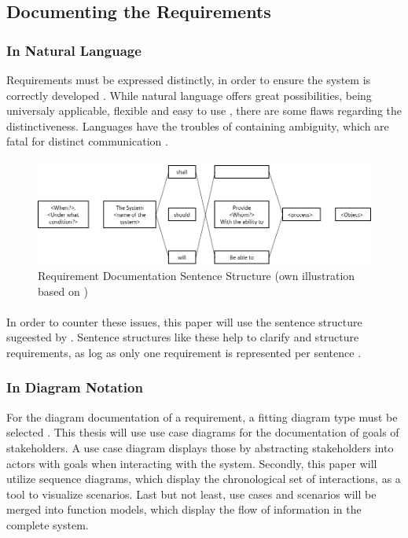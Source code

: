 \subsection{Documenting the Requirements}
\subsubsection{In Natural Language}
Requirements must be expressed distinctly, in order to ensure the system is correctly developed \parencites[107]{Ebert.2014}. While natural language offers great possibilities, being universaly applicable, flexible and easy to use \parencite[cf.][239]{Pohl.2007}, there are some flaws regarding the distinctiveness. Languages have the troubles of containing  ambiguity, which are fatal for distinct communication \parencite[cf.][239-243]{Pohl.2007}.

\paragraph{}
\begin{figure}[H]
    \centering
    \includegraphics[width=\textwidth]{img/SentenceStructure.png}
    \caption{Requirement Documentation Sentence Structure (own illustration based on \cite[246]{Pohl.2007})}
    \label{fig:sentencestructure}
\end{figure}

\paragraph{} In order to counter these issues, this paper will use the sentence structure sugeested by \textcites[107]{Ebert.2014}[246]{Pohl.2007}. Sentence structures like these help to clarify and structure requirements, as log as only one requirement is represented per sentence \parencite[107]{Ebert.2014}. 


\subsubsection{In Diagram Notation}
For the diagram documentation of a requirement, a fitting diagram type must be selected \textcite[299]{Pohl.2007}.  This thesis will use use case diagrams for the documentation of goals of stakeholders. A use case diagram displays those by abstracting stakeholders into actors with goals when interacting with the system. Secondly, this paper will utilize sequence diagrams, which display the chronological set of interactions, as a tool to visualize scenarios. Last but not least, use cases and scenarios will be merged into function models, which display the flow of information in the complete system. 

